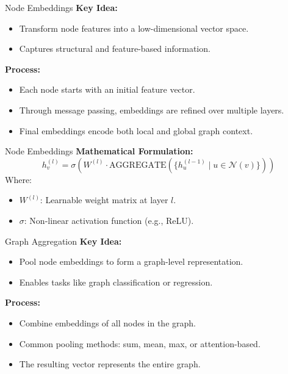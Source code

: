 \documentclass{beamer}
\begin{document}
\begin{frame}{Node Embeddings}
    \textbf{Key Idea:}
    \begin{itemize}
        \item Transform node features into a low-dimensional vector space.
        \item Captures structural and feature-based information.
    \end{itemize}

    \vspace{0.5cm}

    \textbf{Process:}
    \begin{itemize}
        \item Each node starts with an initial feature vector.
        \item Through message passing, embeddings are refined over multiple layers.
        \item Final embeddings encode both local and global graph context.
    \end{itemize}
\end{frame}


\begin{frame}{Node Embeddings}
    \textbf{Mathematical Formulation:}
    \[
    h_v^{(l)} = \sigma\left(W^{(l)} \cdot \text{AGGREGATE}\left(\{h_u^{(l-1)} \mid u \in \mathcal{N}(v)\}\right)\right)
    \]
    Where:
    \begin{itemize}
        \item \( W^{(l)} \): Learnable weight matrix at layer \( l \).
        \item \( \sigma \): Non-linear activation function (e.g., ReLU).
    \end{itemize}
\end{frame}

\begin{frame}{Graph Aggregation}
    \textbf{Key Idea:}
    \begin{itemize}
        \item Pool node embeddings to form a graph-level representation.
        \item Enables tasks like graph classification or regression.
    \end{itemize}

    \textbf{Process:}
    \begin{itemize}
        \item Combine embeddings of all nodes in the graph.
        \item Common pooling methods: sum, mean, max, or attention-based.
        \item The resulting vector represents the entire graph.
    \end{itemize}
\end{frame}
\end{document}
